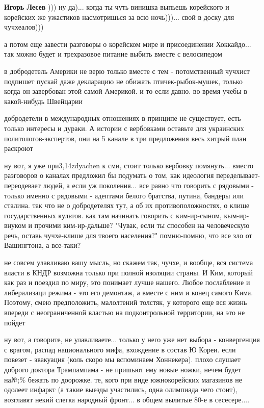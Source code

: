 \begin{itemize}
\begin{itemize}
\textbf{Игорь Лесев} ))) ну да)... когда ты чуть винишка выпьешь корейского и корейских же ужастиков насмотришься за всю ночь)))... свой в доску для чучхеалов)))

а потом еще завести разговоры о корейском мире и присоединении Хоккайдо... так можно будет и трехразовое питание выбить вместе с велосипедом
\end{itemize} %


в добродетель Америки не верю только вместе с тем - потомственный чучхист
подпишет пускай даже декларацию не обижать птичек-рыбок-мушек, только когда он
завербован этой самой Америкой. и то если давно. во время учебы в какой-нибудь
Швейцарии

\begin{itemize} %

добродетели в международных отношениях в принципе не существует, есть только
интересы и дураки. А истории с вербовками оставьте для украинских
политологов-экспертов, они на 5 канале в три предложения весь хитрый план
раскроют


ну вот, я уже при3,14zdyachen к сми, стоит только вербовку помянуть... вместо
разговоров о каналах предложил бы подумать о том, как идеология
переделывает-переодевает людей, а если уж поколения... все равно что говорить с
рядовыми - только именно с рядовыми - адептами белого братства, путина, бандеры
или сталина. так что не о добродетелях тут, а об их противоположностях, о клише
государственных культов. как там начинать говорить с ким-ир-сыном,
кым-ир-внуком и прочими ким-ир-дальше? "Чувак, если ты способен на человеческую
речь, оставь чучхе-клише для твоего населения?" помню-помню, что все зло от
Вашингтона, а все-таки?



не совсем улавливаю вашу мысль, но скажем так, чучхе, и вообще, вся система
власти в КНДР возможна только при полной изоляции страны. И Ким, который как
раз и поездил по миру, это понимает лучше нашего. Любое послабление и
либерализаци режима - это его демонтаж, а вместе с ним и конец самого Кима.
Поэтому, смею предположить, малолтений толстяк, у которого еще вся жизнь
впереди с неограниченной властью на подконтрольной территории, на это не пойдет


ну вот, а говорите, не улавливаете... только у него уже нет выбора -
конвергенция с врагом, распад национального мифа, вхождение в состав Ю Кореи.
если повезет - эвакуация (коль скоро мы вспоминаем Хоннекера). плохо слушает
доброго доктора Трампампама - не пришьют ему новые ножки, нечем будет на№;\%
бежать по доорожке. те, кого при виде южнокорейских магазинов не одолеет
инфаркт (а такие выезды участились, одна олимпиада чего стоит), возглавят некий
слегка народный фронт... в общем вылитые 80-е в сесесере....


\end{itemize}
\end{itemize}

